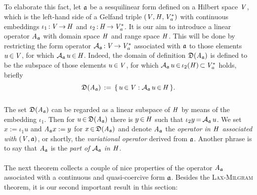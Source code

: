 \documentclass[11pt,twoside]{article}
\begin{document}
\subparagraph{}
To elaborate this fact,
let $\mathfrak{a}$ be a sesquilinear form defined on a Hilbert space $\mathit{V}$,
which is the left-hand side of a Gelfand triple $(\mathit{V},\mathit{H},\mathit{V}_a^*)$
with continuous embeddings
$\iota_1 {\,:\,} \mathit{V} {\,\to\,} \mathit{H}$ and
$\iota_2 {\,:\,} \mathit{H} {\,\to\,} \mathit{V}_a^*$.
It is our aim to introduce a linear operator $\mathit{A}_{\mathfrak{a}}$
with domain space $\mathit{H}$ and range space $\mathit{H}$.
This will be done by restricting the form operator
${{\mathcal{A}}_{\mathfrak{a}}} {\,:\,} \mathit{V} {\,\to\,} \mathit{V}_a^*$ associated with $\mathfrak{a}$
to those elements $u {\,\in\,} \mathit{V}$,
for which ${{\mathcal{A}}_{\mathfrak{a}}} \, u {\,\in\,} \mathit{H}$.
Indeed,
the domain of definition $\mathfrak{D}(\mathit{A}_{\mathfrak{a}})$ is defined
to be the subspace of those elements $u {\,\in\,} \mathit{V}$,
for which ${{\mathcal{A}}_{\mathfrak{a}}} \, u {\,\in\,} \iota_2(\mathit{H}) {\,\subset\,} \mathit{V}_a^*$ holds,
briefly
\[
\mathfrak{D}(\mathit{A}_{\mathfrak{a}}) \,:=\, \{\, u {\,\in\,} \mathit{V}: {{\mathcal{A}}_{\mathfrak{a}}} \, u {\,\in\,} \mathit{H} \,\}.
\]

\subparagraph{} %
The set $\mathfrak{D}(\mathit{A}_{\mathfrak{a}})$ can be regarded as a linear subspace
of $\mathit{H}$ by means of the embedding $\iota_1$.
Then for $u {\,\in\,} \mathfrak{D}(\mathit{A}_{\mathfrak{a}})$ there is $y {\,\in\,} \mathit{H}$
such that $\iota_2 y {\,=\,} {{\mathcal{A}}_{\mathfrak{a}}} \, u$.
We set $x := \iota_1 u$ and $\mathit{A}_{\mathfrak{a}} x := y$
for $x {\,\in\,} \mathfrak{D}(\mathit{A}_{\mathfrak{a}})$
and denote $\mathit{A}_{\mathfrak{a}}$
the \textit{operator in $\mathit{H}$ associated with $(\mathit{V},\mathfrak{a})$},
or shortly,
the \textit{variational operator} derived from $\mathfrak{a}$.
Another phrase is to say that
$\mathit{A}_{\mathfrak{a}}$ is the \textit{part of ${{\mathcal{A}}_{\mathfrak{a}}}$ in $\mathit{H}$}.

\paragraph{} %
The next theorem collects a couple of nice properties 
of the operator $\mathit{A}_{\mathfrak{a}}$
associated with a continuous and quasi-coercive form $\mathfrak{a}$.
Besides the \textsc{Lax-Milgram} theorem,
it is our second important result in this section:
\end{document}
